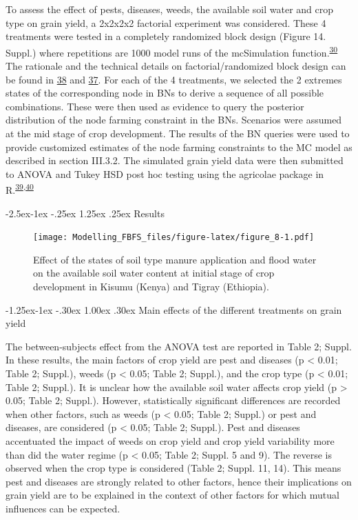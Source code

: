 \documentclass[12pt,oneside]{article}
\makeatletter
\renewcommand\paragraph{\@startsection{paragraph}{4}{\z@}%
            {-2.5ex\@plus -1ex \@minus -.25ex}%
            {1.25ex \@plus .25ex}%
            {\normalfont\normalsize\bfseries}}
\renewcommand\subparagraph{\@startsection{subparagraph}{5}{\z@}%
            {-1.25ex\@plus -1ex \@minus -.30ex}%
            {1.00ex \@plus .30ex}%
            {\normalfont\normalsize\bfseries\itshape}}
\makeatother
\begin{document}
To assess the effect of pests, diseases, weeds, the available soil water
and crop type on grain yield, a 2x2x2x2 factorial experiment was
considered. These 4 treatments were tested in a completely randomized
block design (Figure 14. Suppl.) where repetitions are 1000 model runs
of the mcSimulation
function.\textsuperscript{\protect\hyperlink{ref-Luedeling_and_Goehring_2018}{30}}
The rationale and the technical details on factorial/randomized block
design can be found in
\protect\hyperlink{ref-Panse_and_Sukhatme_1957}{38} and
\protect\hyperlink{ref-Gomez_and_Gomez_1984}{37}. For each of the 4
treatments, we selected the 2 extremes states of the corresponding node
in BNs to derive a sequence of all possible combinations. These were
then used as evidence to query the posterior distribution of the node
farming constraint in the BNs. Scenarios were assumed at the mid stage
of crop development. The results of the BN queries were used to provide
customized estimates of the node farming constraints to the MC model as
described in section III.3.2. The simulated grain yield data were then
submitted to ANOVA and Tukey HSD post hoc testing using the agricolae
package in
R.\textsuperscript{\protect\hyperlink{ref-DeMendiburu_2016}{39},\protect\hyperlink{ref-RCoreTeam_2018}{40}}

\hypertarget{results}{%
\paragraph{Results}\label{results}}

\begin{figure}
\centering
\texttt{[image: Modelling\_FBFS\_files/figure-latex/figure\_8-1.pdf]}
\caption{\label{figures:figure_6}Effect of the states of soil type
manure application and flood water on the available soil water content
at initial stage of crop development in Kisumu (Kenya) and Tigray
(Ethiopia).}
\end{figure}

\hypertarget{main-effects-of-the-different-treatments-on-grain-yield}{%
\subparagraph{Main effects of the different treatments on grain
yield}\label{main-effects-of-the-different-treatments-on-grain-yield}}

The between-subjects effect from the ANOVA test are reported in Table 2;
Suppl. In these results, the main factors of crop yield are pest and
diseases (p \textless{} 0.01; Table 2; Suppl.), weeds (p \textless{}
0.05; Table 2; Suppl.), and the crop type (p \textless{} 0.01; Table 2;
Suppl.). It is unclear how the available soil water affects crop yield
(p \textgreater{} 0.05; Table 2; Suppl.). However, statistically
significant differences are recorded when other factors, such as weeds
(p \textless{} 0.05; Table 2; Suppl.) or pest and diseases, are
considered (p \textless{} 0.05; Table 2; Suppl.). Pest and diseases
accentuated the impact of weeds on crop yield and crop yield variability
more than did the water regime (p \textless{} 0.05; Table 2; Suppl. 5
and 9). The reverse is observed when the crop type is considered (Table
2; Suppl. 11, 14). This means pest and diseases are strongly related to
other factors, hence their implications on grain yield are to be
explained in the context of other factors for which mutual influences
can be expected.
\end{document}

